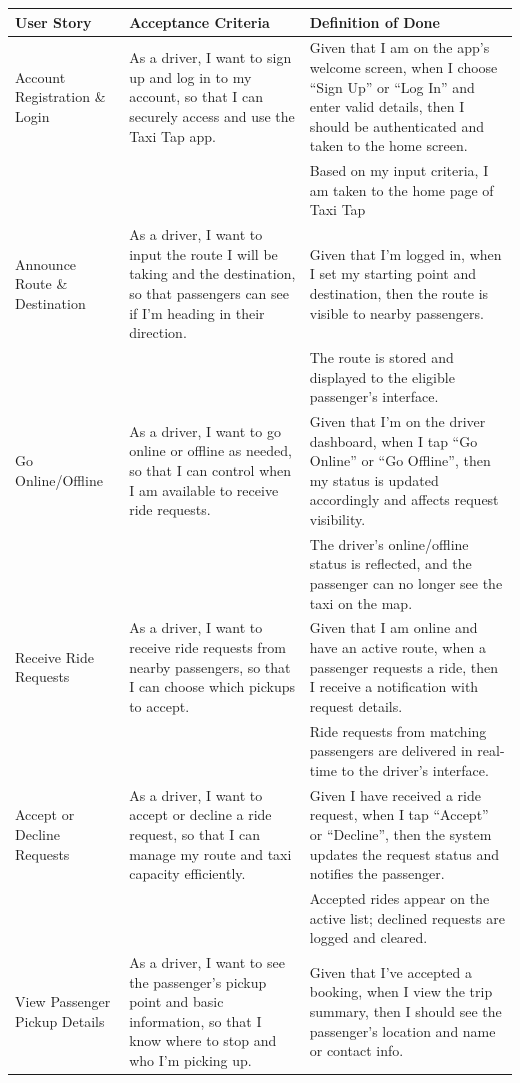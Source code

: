 \documentclass[a4paper,12pt]{article}
\begin{document}
\begin{longtable}{|p{4cm}|p{6cm}|p{5cm}|}
\hline
\textbf{User Story} & \textbf{Acceptance Criteria} & \textbf{Definition of Done} \\
\hline
Account Registration \& Login & As a driver, I want to sign up and log in to my account, so that I can securely access and use the Taxi Tap app. & Given that I am on the app’s welcome screen, when I choose “Sign Up” or “Log In” and enter valid details, then I should be authenticated and taken to the home screen. \\
& & Based on my input criteria, I am taken to the home page of Taxi Tap \\
\hline
Announce Route \& Destination & As a driver, I want to input the route I will be taking and the destination, so that passengers can see if I’m heading in their direction. & Given that I’m logged in, when I set my starting point and destination, then the route is visible to nearby passengers. \\
& & The route is stored and displayed to the eligible passenger's interface. \\
\hline
Go Online/Offline & As a driver, I want to go online or offline as needed, so that I can control when I am available to receive ride requests. & Given that I’m on the driver dashboard, when I tap “Go Online” or “Go Offline”, then my status is updated accordingly and affects request visibility. \\
& & The driver's online/offline status is reflected, and the passenger can no longer see the taxi on the map. \\
\hline
Receive Ride Requests & As a driver, I want to receive ride requests from nearby passengers, so that I can choose which pickups to accept. & Given that I am online and have an active route, when a passenger requests a ride, then I receive a notification with request details. \\
& & Ride requests from matching passengers are delivered in real-time to the driver’s interface. \\
\hline
Accept or Decline Requests & As a driver, I want to accept or decline a ride request, so that I can manage my route and taxi capacity efficiently. & Given I have received a ride request, when I tap “Accept” or “Decline”, then the system updates the request status and notifies the passenger. \\
& & Accepted rides appear on the active list; declined requests are logged and cleared. \\
\hline
View Passenger Pickup Details & As a driver, I want to see the passenger’s pickup point and basic information, so that I know where to stop and who I’m picking up. & Given that I’ve accepted a booking, when I view the trip summary, then I should see the passenger’s location and name or contact info. \\

\end{longtable}
\end{document}
